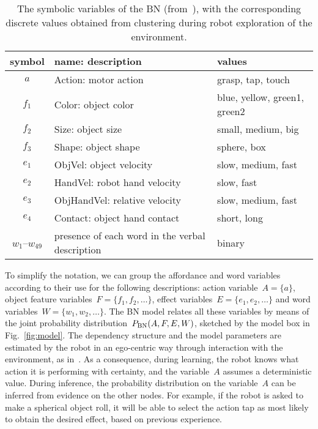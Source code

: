 \begin{table}
    \centering
    \caption{The symbolic variables of the \acl{BN} (from~\cite{salvi:2012:smcb}), with the corresponding discrete values obtained from clustering during robot exploration of the environment.}
    \label{tab:bnsymb}
    \begin{tabular}{cp{3.3cm}l}
    \toprule
    symbol & name: description     & values \\
    \midrule
    $a$ & Action: motor action          & grasp, tap, touch \\
    \midrule
    $f_1$ & Color: object color   & blue, yellow, green1, green2 \\
    $f_2$ & Size: object size     & small, medium, big \\
    $f_3$ & Shape: object shape    & sphere, box \\
    \midrule
    $e_1$ & ObjVel: object velocity & slow, medium, fast \\
    $e_2$ & HandVel: robot hand velocity & slow, fast \\
    $e_3$ & ObjHandVel: relative \objecthand{} velocity & slow, medium, fast \\
    $e_4$ & Contact: object hand contact & short, long \\
    \midrule
    $w_1$--$w_{49}$ & presence of each word in the verbal description & binary \\
    \bottomrule
    \end{tabular}
\end{table}

To simplify the notation, we can group the affordance and word variables according to their use for the following descriptions: action variable~$A = \{a\}$, object feature variables~$F=\{f_1, f_2, \dots\}$, effect variables~$E=\{e_1, e_2, \dots\}$ and word variables~$W = \{w_1, w_2, \dots\}$.
The \ac{BN} model relates all these variables by means of the joint probability distribution~$P_{\text{BN}}(A, F, E, W)$, sketched by the \AffWords{} model box in Fig.~\ref{fig:model}.
The dependency structure and the model parameters are estimated by the robot in an ego-centric way through interaction with the environment, as in~\cite{salvi:2012:smcb}.
As a consequence, during learning, the robot knows what action it is performing with certainty, and the variable~$A$ assumes a deterministic value.
During inference, the probability distribution on the variable~$A$ can be inferred from evidence on the other nodes.
For example, if the robot is asked to make a spherical object roll, it will be able to select the action tap as most likely to obtain the desired effect, based on previous experience.

